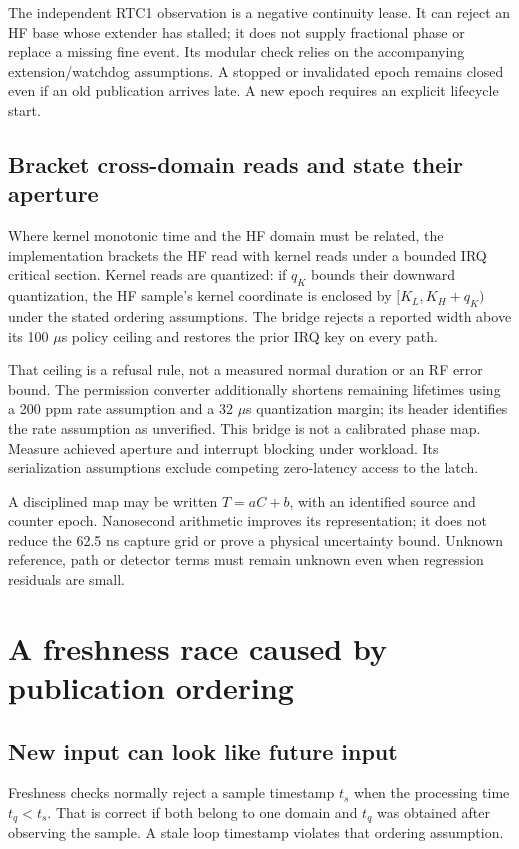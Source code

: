 \documentclass[10pt,letterpaper]{article}
\begin{document}
The independent RTC1 observation is a negative continuity lease. It can reject an HF base whose extender has stalled; it does not supply fractional phase or replace a missing fine event. Its modular check relies on the accompanying extension/watchdog assumptions. A stopped or invalidated epoch remains closed even if an old publication arrives late. A new epoch requires an explicit lifecycle start.

\subsection{Bracket cross-domain reads and state their aperture}
Where kernel monotonic time and the HF domain must be related, the implementation brackets the HF read with kernel reads under a bounded IRQ critical section. Kernel reads are quantized: if $q_K$ bounds their downward quantization, the HF sample's kernel coordinate is enclosed by $[K_L,K_H+q_K)$ under the stated ordering assumptions. The bridge rejects a reported width above its 100 $\mu$s policy ceiling and restores the prior IRQ key on every path.

That ceiling is a refusal rule, not a measured normal duration or an RF error bound. The permission converter additionally shortens remaining lifetimes using a 200 ppm rate assumption and a 32 $\mu$s quantization margin; its header identifies the rate assumption as unverified. This bridge is not a calibrated phase map. Measure achieved aperture and interrupt blocking under workload. Its serialization assumptions exclude competing zero-latency access to the latch.

A disciplined map may be written $T=aC+b$, with an identified source and counter epoch. Nanosecond arithmetic improves its representation; it does not reduce the 62.5 ns capture grid or prove a physical uncertainty bound. Unknown reference, path or detector terms must remain unknown even when regression residuals are small.

\newpage
\section{A freshness race caused by publication ordering}
\subsection{New input can look like future input}
Freshness checks normally reject a sample timestamp $t_s$ when the processing time $t_q<t_s$. That is correct if both belong to one domain and $t_q$ was obtained after observing the sample. A stale loop timestamp violates that ordering assumption.
\end{document}
